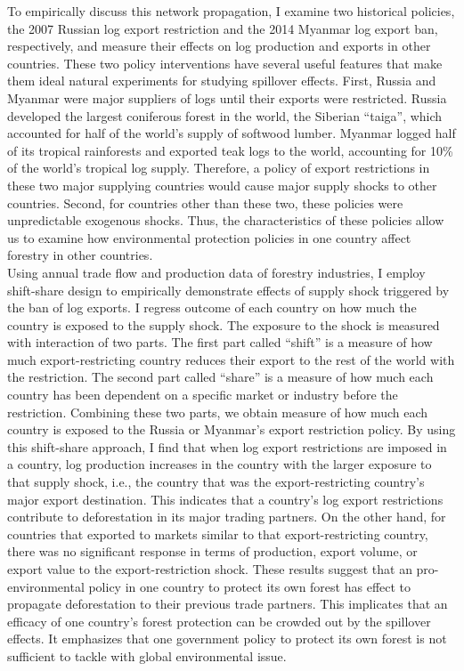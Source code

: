\documentclass[a4paper,12pt]{article}
\begin{document}
To empirically discuss this network propagation, I examine two historical policies, the 2007 Russian log export restriction and the 2014 Myanmar log export ban, respectively, and measure their effects on log production and exports in other countries. These two policy interventions have several useful features that make them ideal natural experiments for studying spillover effects. First, Russia and Myanmar were major suppliers of logs until their exports were restricted. Russia developed the largest coniferous forest in the world, the Siberian ``taiga'', which accounted for half of the world's supply of softwood lumber. Myanmar logged half of its tropical rainforests and exported teak logs to the world, accounting for 10\% of the world's tropical log supply. Therefore, a policy of export restrictions in these two major supplying countries would cause major supply shocks to other countries. Second, for countries other than these two, these policies were unpredictable exogenous shocks. Thus, the characteristics of these policies allow us to examine how environmental protection policies in one country affect forestry in other countries.\\

Using annual trade flow and production data of forestry industries, I employ shift-share design to empirically demonstrate effects of supply shock triggered by the ban of log exports. I regress outcome of each country on how much the country is exposed to the supply shock. The exposure to the shock is measured with interaction of two parts. The first part called ``shift'' is a measure of how much export-restricting country reduces their export to the rest of the world with the restriction. The second part called ``share'' is a measure of how much each country has been dependent on a specific market or industry before the restriction. Combining these two parts, we obtain measure of how much each country is exposed to the Russia or Myanmar's export restriction policy. By using this shift-share approach, I find that when log export restrictions are imposed in a country, log production increases in the country with the larger exposure to that supply shock, i.e., the country that was the export-restricting country's major export destination. This indicates that a country's log export restrictions contribute to deforestation in its major trading partners. On the other hand, for countries that exported to markets similar to that export-restricting country, there was no significant response in terms of production, export volume, or export value to the export-restriction shock. These results suggest that an pro-environmental policy in one country to protect its own forest has effect to propagate deforestation to their previous trade partners. This implicates that an efficacy of one country's forest protection can be crowded out by the spillover effects. It emphasizes that one government policy to protect its own forest is not sufficient to tackle with global environmental issue.\\
\end{document}
